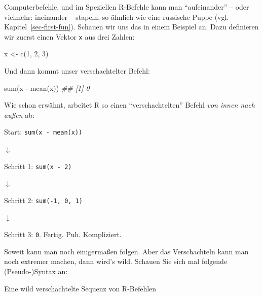 \documentclass[
  letterpaper,
]{scrbook}
\newenvironment{Shaded}{\begin{snugshade}}{\end{snugshade}}
\newcommand{\DecValTok}[1]{\textcolor[rgb]{0.68,0.00,0.00}{#1}}
\newcommand{\DocumentationTok}[1]{\textcolor[rgb]{0.37,0.37,0.37}{\textit{#1}}}
\newcommand{\FunctionTok}[1]{\textcolor[rgb]{0.28,0.35,0.67}{#1}}
\newcommand{\NormalTok}[1]{\textcolor[rgb]{0.00,0.23,0.31}{#1}}
\newcommand{\OtherTok}[1]{\textcolor[rgb]{0.00,0.23,0.31}{#1}}
\newcommand{\SpecialCharTok}[1]{\textcolor[rgb]{0.37,0.37,0.37}{#1}}
\theoremstyle{definition}
\theoremstyle{definition}
\theoremstyle{definition}
\theoremstyle{remark}
\begin{document}
Computerbefehle, und im Speziellen R-Befehle kann man ``aufeinander'' --
oder vielmehr: ineinander -- stapeln, so ähnlich wie eine russische
Puppe (vgl. Kapitel~\ref{sec-first-fun}). Schauen wir uns das in einem
Beispiel an. Dazu definieren wir zuerst einen Vektor \texttt{x} aus drei
Zahlen:

\begin{Shaded}
\begin{Highlighting}[]
\NormalTok{x }\OtherTok{\textless{}{-}} \FunctionTok{c}\NormalTok{(}\DecValTok{1}\NormalTok{, }\DecValTok{2}\NormalTok{, }\DecValTok{3}\NormalTok{)}
\end{Highlighting}
\end{Shaded}

Und dann kommt unser verschachtelter Befehl:

\begin{Shaded}
\begin{Highlighting}[]
\FunctionTok{sum}\NormalTok{(x }\SpecialCharTok{{-}} \FunctionTok{mean}\NormalTok{(x))}
\DocumentationTok{\#\# [1] 0}
\end{Highlighting}
\end{Shaded}

Wie schon erwähnt, arbeitet R so einen ``verschachtelten'' Befehl
\emph{von innen nach außen} ab:

Start: \texttt{sum(x\ -\ mean(x))}

{\(\downarrow\)}

Schritt 1: \texttt{sum(x\ -\ 2)}

{\(\downarrow\)}

Schritt 2: \texttt{sum(-1,\ 0,\ 1)}

{\(\downarrow\)}

Schritt 3: \texttt{0}. Fertig. Puh. Kompliziert.

Soweit kann man noch einigermaßen folgen. Aber das Verschachteln kann
man noch extremer machen, dann wird's wild. Schauen Sie sich mal
folgende (Pseudo-)Syntax an:

\begin{codelisting}

\caption{\label{lst-schachtel}Eine wild verschachtelte Sequenz von
R-Befehlen}

\centering{

\begin{Shaded}
\begin{Highlighting}[]
\FunctionTok{fasse\_zusammen}\NormalTok{(}
  \FunctionTok{gruppiere}\NormalTok{(}
\NormalTok{    wähle}\FunctionTok{\_spalten}\NormalTok{(}
      \FunctionTok{filter\_zeilen}\NormalTok{(meine\_daten))))}
\end{Highlighting}
\end{Shaded}

}

\end{codelisting}%
\end{document}

